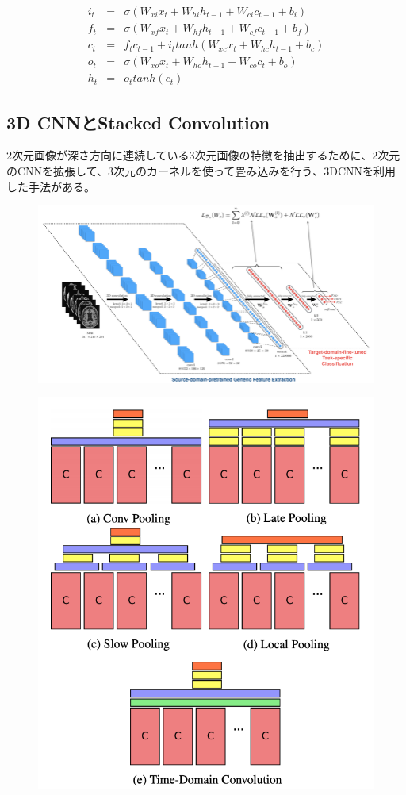 \begin{align}
  i_t & = & \sigma(W_{xi} x_t + W_{hi} h_{t-1} + W_{ci} c_{t-1} + b_i) \\
  f_t & = & \sigma(W_{xf} x_t + W_{hf} h_{t-1} + W_{cf} c_{t-1} + b_f ) \\
  c_t & = & f_t c_{t-1} + i_t tanh(W_{xc} x_t + W_{hc} h_{t-1} + b_c) \\
  o_t & = & \sigma(W_{xo} x_t + W_{ho} h_{t-1} + W_{co} c_t + b_o) \\
  h_t & = & o_t tanh(c_t) 
\end{align}

\subsection*{3D CNNとStacked Convolution}
2次元画像が深さ方向に連続している3次元画像の特徴を抽出するために、2次元のCNNを拡張して、3次元のカーネルを使って畳み込みを行う、3DCNNを利用した手法がある。

\begin{figure}[h]
\centering
\includegraphics[width=0.7\linewidth]{fig/3d_cnn.png}
\end{figure}


\begin{figure}[h]
\centering
\includegraphics[width=0.7\linewidth]{fig/stacked_conv.png}
\end{figure}

